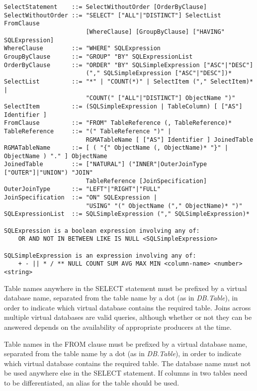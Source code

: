 \begin{verbatim}
SelectStatement    ::= SelectWithoutOrder [OrderByClause]
SelectWithoutOrder ::= "SELECT" ["ALL"|"DISTINCT"] SelectList FromClause
                       [WhereClause] [GroupByClause] ["HAVING" SQLExpression]
WhereClause        ::= "WHERE" SQLExpression
GroupByClause      ::= "GROUP" "BY" SQLExpressionList
OrderByClause      ::= "ORDER" "BY" SQLSimpleExpression ["ASC"|"DESC"]
                       ("," SQLSimpleExpression ["ASC"|"DESC"])*
SelectList         ::= "*" | "COUNT(*)" | SelectItem ("," SelectItem)* |
                       "COUNT(" ["ALL"|"DISTINCT"] ObjectName ")"
SelectItem         ::= (SQLSimpleExpression | TableColumn) [ ["AS"] Identifier ]
FromClause         ::= "FROM" TableReference (, TableReference)*
TableReference     ::= "(" TableReference ")" |
                       RGMATableName [ ["AS"] Identifier ] JoinedTable
RGMATableName      ::= [ ( "{" ObjectName (, ObjectName)* "}" | ObjectName ) "." ] ObjectName
JoinedTable        ::= ["NATURAL"] ("INNER"|OuterJoinType ["OUTER"]|"UNION") "JOIN"
                       TableReference [JoinSpecification]
OuterJoinType      ::= "LEFT"|"RIGHT"|"FULL"
JoinSpecification  ::= "ON" SQLExpression |
                       "USING" "(" ObjectName ("," ObjectName)* ")"
SQLExpressionList  ::= SQLSimpleExpression ("," SQLSimpleExpression)*

SQLExpression is a boolean expression involving any of: 
    OR AND NOT IN BETWEEN LIKE IS NULL <SQLSimpleExpression>

SQLSimpleExpression is an expression involving any of: 
    + - || * / ** NULL COUNT SUM AVG MAX MIN <column-name> <number> <string>
\end{verbatim}

Table names anywhere in the SELECT statement must be prefixed by a
virtual database name, separated from the table name by a dot
(as in \textit{DB.Table}), in order to indicate which virtual database contains
the required table. Joins across multiple virtual databases are valid queries,
although whether or not they can be answered depends on the availability of
appropriate producers at the time.

Table names in the FROM clause must be prefixed by a
virtual database name, separated from the table name by a dot
(as in \textit{DB.Table}), in order to indicate which virtual database contains
the required table.  The database name must not be used anywhere else in the SELECT
statement.  If columns in two tables need to be differentiated, an alias for the
table should be used.

